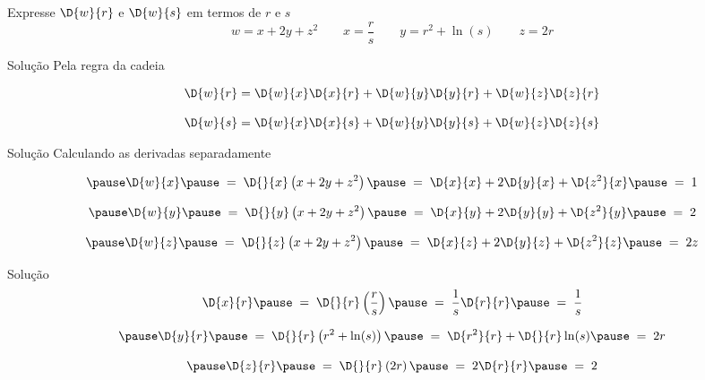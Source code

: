 \begin{question}
    Expresse \(\D{w}{r}\) e \(\D{w}{s}\) em termos de $r$ e $s$
    \[
        w = x + 2y + z^2    \qquad
        x = \frac{r}{s}     \qquad
        y = r^2 + \ln(s)    \qquad
        z = 2r
    \]
\end{question}

\begin{resolution}{Solução}
  Pela regra da cadeia

  \begin{align*}
    \D{w}{r} & = \D{w}{x}\D{x}{r} + \D{w}{y}\D{y}{r} + \D{w}{z}\D{z}{r}  \\[3mm]
    \D{w}{s} & = \D{w}{x}\D{x}{s} + \D{w}{y}\D{y}{s} + \D{w}{z}\D{z}{s}
  \end{align*}
\end{resolution}

\begin{resolution}{Solução}
  Calculando as derivadas separadamente

  \[
    \pause
    \D{w}{x}
    \pause
    \;=\; \D{}{x}\left(x + 2y + z^2\right)
    \pause
    \;=\; \D{x}{x} + 2\D{y}{x} + \D{z^2}{x}
    \pause
    \;=\; 1
  \]

  \[
    \pause
    \D{w}{y}
    \pause
    \;=\; \D{}{y}\left(x + 2y + z^2\right)
    \pause
    \;=\; \D{x}{y} + 2\D{y}{y} + \D{z^2}{y}
    \pause
    \;=\; 2
  \]

  \[
    \pause
    \D{w}{z}
    \pause
    \;=\; \D{}{z}\left(x + 2y + z^2\right)
    \pause
    \;=\; \D{x}{z} + 2\D{y}{z} + \D{z^2}{z}
    \pause
    \;=\; 2z
  \]
\end{resolution}

\begin{resolution}{Solução}
  \[
    \D{x}{r}
    \pause
    \;=\; \D{}{r}\left(\frac{r}{s}\right)
    \pause
    \;=\; \frac{1}{s}\D{r}{r}
    \pause
    \;=\; \frac{1}{s}
  \]

  \[
    \pause
    \D{y}{r}
    \pause
    \;=\; \D{}{r}\left(r^2 + \ln(s)\right)
    \pause
    \;=\; \D{r^2}{r} + \D{}{r}\ln(s)
    \pause
    \;=\; 2r
  \]

  \[
    \pause
    \D{z}{r}
    \pause
    \;=\; \D{}{r}\left(2r\right)
    \pause
    \;=\; 2\D{r}{r}
    \pause
    \;=\; 2
  \]
\end{resolution}

